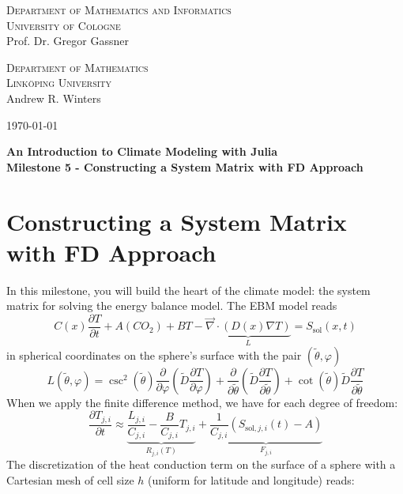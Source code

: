 \documentclass[10pt]{scrartcl}
\begin{document}
\begin{minipage}{.5\textwidth}
{\scshape Department of Mathematics and Informatics \\
University of Cologne\\}
\small Prof. Dr. Gregor Gassner \\
\end{minipage}
\begin{minipage}{.3\textwidth}
{\scshape Department of Mathematics \\
Link\"{o}ping University\\}
\small Andrew R. Winters \\
\end{minipage}
\hfill
\begin{minipage}{.15\textwidth}
\begin{flushright}
\today
\end{flushright}
\end{minipage}

\begin{center}
{\Large\bfseries
An Introduction to Climate Modeling with Julia}\\
\vspace{0.2cm}
{\bfseries Milestone 5 - Constructing a System Matrix with FD Approach}
\end{center}


\section{Constructing a System Matrix with FD Approach}

In this milestone, you will build the heart of the climate model: the system matrix for solving the energy balance model.
The EBM model reads
\begin{equation}
C(x)\frac{\partial T}{\partial t}+A(CO_2)+BT - \underbrace{\vec{\nabla} \cdot (D(x)\nabla T)}_{L} = S_\text{sol}(x,t)
\label{EBM}
\end{equation}
in spherical coordinates on the sphere's surface with the pair $ (\tilde{\theta},\varphi)$
\begin{equation}
L(\tilde{\theta},\varphi) = \csc^2(\tilde{\theta})\frac{\partial}{\partial \varphi}\left(\tilde{D} \frac{\partial T}{\partial \varphi}\right)+\frac{\partial}{\partial \tilde{\theta}}\left(\tilde{D} \frac{\partial T}{\partial \tilde{\theta}}\right)+ \cot(\tilde{\theta})\tilde{D}\frac{\partial T}{\partial \tilde{\theta}}
\label{Operator}
\end{equation}
When we apply the finite difference method, we have for each degree of freedom:
\begin{equation}
\frac{\partial T_{j,i}}{\partial t} \approx \underbrace{\frac{L_{j,i}}{C_{j,i}} - \frac{B}{C_{j,i}} T_{j,i}}_{R_{j,i}(T)} + \underbrace{ \frac{1}{C_{j,i}} \left(S_{\text{sol}, j, i}(t) - A\right)}_{F_{j,i}}
\label{DoF}
\end{equation}
The discretization of the heat conduction term on the surface of a sphere with a Cartesian mesh of cell size $h$ (uniform for latitude and longitude) reads:
\end{document}
